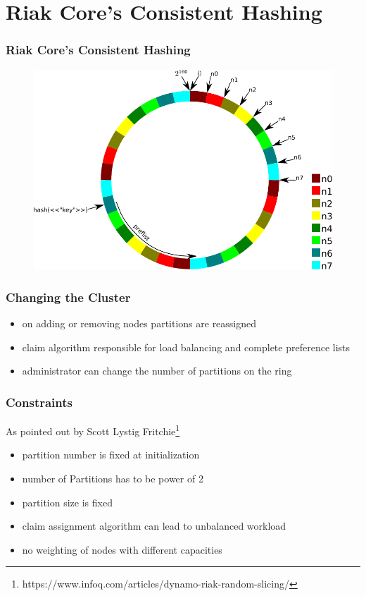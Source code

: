 \documentclass[aspectratio=169]{beamer}
\begin{document}
\section{Riak Core's Consistent Hashing}
\begin{frame}
\frametitle{Riak Core's Consistent Hashing}
\begin{figure}
\includegraphics[height=0.8\textheight]{../images/consistent_hashing_example}
\end{figure}
\end{frame}

\begin{frame}
\frametitle{Changing the Cluster}
\begin{itemize}
\item on adding or removing nodes partitions are reassigned
\item claim algorithm responsible for load balancing and complete preference lists
\item administrator can change the number of partitions on the ring
\end{itemize}
\end{frame}

\begin{frame}
\frametitle{Constraints}
As pointed out by Scott Lystig Fritchie\footnote{https://www.infoq.com/articles/dynamo-riak-random-slicing/}
\begin{itemize}
\item partition number is fixed at initialization
\item number of Partitions has to be power of 2
\item partition size is fixed
\item claim assignment algorithm can lead to unbalanced workload
\item no weighting of nodes with different capacities
\end{itemize}
\end{frame}
\end{document}
